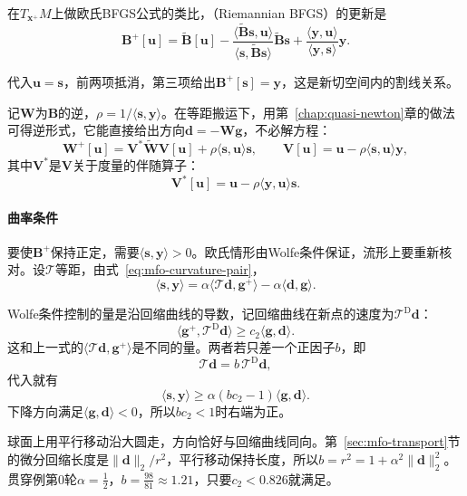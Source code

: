 在$T_{\bm{x}^{+}}M$上做欧氏BFGS公式的类比，（Riemannian BFGS）的更新是
\begin{equation}
 \bm{B}^{+}[\bm{u}]=\widetilde{\bm{B}}[\bm{u}]-\frac{\langle\widetilde{\bm{B}}\bm{s},\bm{u}\rangle}{\langle\bm{s},\widetilde{\bm{B}}\bm{s}\rangle}\widetilde{\bm{B}}\bm{s}+\frac{\langle\bm{y},\bm{u}\rangle}{\langle\bm{y},\bm{s}\rangle}\bm{y}.
 \label{eq:mfo-rbfgs}
\end{equation}

代入$\bm{u}=\bm{s}$，前两项抵消，第三项给出$\bm{B}^{+}[\bm{s}]=\bm{y}$，这是新切空间内的割线关系。

记$\bm{W}$为$\bm{B}$的逆，$\rho=1/\langle\bm{s},\bm{y}\rangle$。在等距搬运下，用第~\ref{chap:quasi-newton}章的做法可得逆形式，它能直接给出方向$\bm{d}=-\bm{W}\bm{g}$，不必解方程：
\begin{equation}
 \bm{W}^{+}[\bm{u}]=\bm{V}^{*}\widetilde{\bm{W}}\bm{V}[\bm{u}]+\rho\langle\bm{s},\bm{u}\rangle\bm{s},\qquad
 \bm{V}[\bm{u}]=\bm{u}-\rho\langle\bm{s},\bm{u}\rangle\bm{y},
 \label{eq:mfo-rbfgs-inverse}
\end{equation}
其中$\bm{V}^{*}$是$\bm{V}$关于度量的伴随算子：
\[
 \bm{V}^{*}[\bm{u}]=\bm{u}-\rho\langle\bm{y},\bm{u}\rangle\bm{s}.
\]

\paragraph{曲率条件}
要使$\bm{B}^{+}$保持正定，需要$\langle\bm{s},\bm{y}\rangle>0$。欧氏情形由Wolfe条件保证，流形上要重新核对。设$\mathcal{T}$等距，由式~\eqref{eq:mfo-curvature-pair}，
\[
 \langle\bm{s},\bm{y}\rangle=\alpha\langle\mathcal{T}\bm{d},\bm{g}^{+}\rangle-\alpha\langle\bm{d},\bm{g}\rangle.
\]

Wolfe条件控制的量是沿回缩曲线的导数，记回缩曲线在新点的速度为$\mathcal{T}^{\mathrm{D}}\bm{d}$：
\[
 \langle\bm{g}^{+},\mathcal{T}^{\mathrm{D}}\bm{d}\rangle\geq c_2\langle\bm{g},\bm{d}\rangle.
\]
这和上一式的$\langle\mathcal{T}\bm{d},\bm{g}^{+}\rangle$是不同的量。两者若只差一个正因子$b$，即
\[
 \mathcal{T}\bm{d}=b\,\mathcal{T}^{\mathrm{D}}\bm{d},
\]
代入就有
\begin{equation}
 \langle\bm{s},\bm{y}\rangle\geq\alpha(bc_2-1)\langle\bm{g},\bm{d}\rangle.
 \label{eq:mfo-locking}
\end{equation}
下降方向满足$\langle\bm{g},\bm{d}\rangle<0$，所以$bc_2<1$时右端为正。

球面上用平行移动沿大圆走，方向恰好与回缩曲线同向。第~\ref{sec:mfo-transport}节的微分回缩长度是$\lVert\bm{d}\rVert_2/r^2$，平行移动保持长度，所以$b=r^2=1+\alpha^2\lVert\bm{d}\rVert_2^2$。贯穿例第$0$轮$\alpha=\tfrac12$，$b=\tfrac{98}{81}\approx1.21$，只要$c_2<0.826$就满足。

